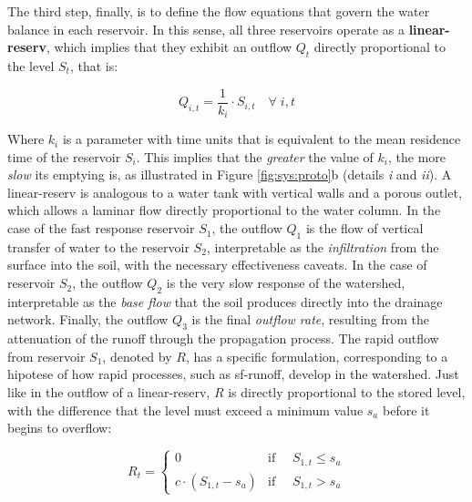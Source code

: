\documentclass[./main_en.tex]{subfiles}
\begin{document}
\par The third step, finally, is to define the flow equations that govern the water balance in each reservoir. In this sense, all three reservoirs operate as a \textbf{\gls{linear-reserv}}, which implies that they exhibit an outflow $Q_t$ directly proportional to the level $S_t$, that is:
\begin{linenomath*}
\begin{equation} 
	\label{eq:linear_reservoir}
	Q_{i, t} = \frac{1}{k_{i}} \cdot S_{i,t} \quad \forall \;  i, t 
\end{equation}
\end{linenomath*}
Where $k_i$ is a parameter with time units that is equivalent to the mean residence time of the reservoir $S_i$. This implies that the \textit{greater} the value of $k_i$, the more \textit{slow} its emptying is, as illustrated in Figure \ref{fig:sys:proto}b (details \textit{i} and \textit{ii}). A \gls{linear-reserv} is analogous to a water tank with vertical walls and a porous outlet, which allows a laminar flow directly proportional to the water column. In the case of the fast response reservoir $S_1$, the outflow $Q_1$ is the flow of vertical transfer of water to the reservoir $S_2$, interpretable as the \textit{infiltration} from the surface into the soil, with the necessary effectiveness caveats. In the case of reservoir $S_2$, the outflow $Q_2$ is the very slow response of the watershed, interpretable as the \textit{base flow} that the soil produces directly into the drainage network. Finally, the outflow $Q_3$ is the final \textit{outflow rate}, resulting from the attenuation of the runoff through the propagation process. The rapid outflow from reservoir $S_1$, denoted by $R$, has a specific formulation, corresponding to a \gls{hipotese} of how rapid processes, such as \gls{sf-runoff}, develop in the watershed. Just like in the outflow of a \gls{linear-reserv}, $R$ is directly proportional to the stored level, with the difference that the level must exceed a minimum value $s_a$ before it begins to overflow:
\begin{linenomath*}
\begin{equation} 
	\label{eq:fast_response}
 R_{t} = 
\begin{cases} 
    0 & \text{if } \quad S_{1,t} \leq s_a\\
    c \cdot (S_{1,t} - s_a) & \text{if } \quad S_{1,t} > s_a
\end{cases}
\end{equation}
\end{linenomath*}
\end{document}
